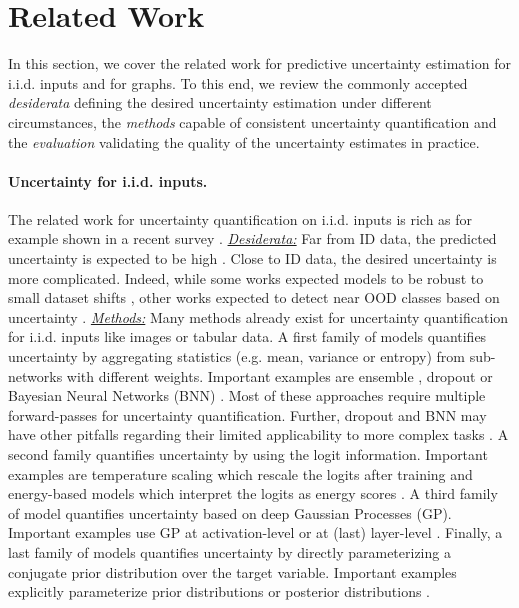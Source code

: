 \section{Related Work}
\label{sec:related_work_009}

In this section, we cover the related work for predictive uncertainty estimation for i.i.d. inputs and for graphs. To this end, we review the commonly accepted \emph{desiderata} defining the desired uncertainty estimation under different circumstances, the \emph{methods} capable of consistent uncertainty quantification and the \emph{evaluation} validating the quality of the uncertainty estimates in practice.

\paragraph{Uncertainty for i.i.d. inputs.} The related work for uncertainty quantification on i.i.d. inputs is rich as for example shown in a recent survey \citep{review-uncertainty-dl}. \emph{\underline{Desiderata:}} Far from ID data, the predicted uncertainty is expected to be high \citep{provable-uncertainty, NatPN2021, bayesian-a-bit, sufficient-conditions-no-adversarial}. Close to ID data, the desired uncertainty is more complicated. Indeed, while some works expected models to be robust to small dataset shifts \citep{dataset-shift, stutz2020}, other works expected to detect near OOD classes based on uncertainty \citep{contrastive-ood, robustness-uncertainty-dirichlet, attack-detection}. \emph{\underline{Methods:}} Many methods already exist for uncertainty quantification for i.i.d. inputs like images or tabular data. A first family of models quantifies uncertainty by aggregating statistics (e.g. mean, variance or entropy) from sub-networks with different weights. Important examples are ensemble \citep{ensembles, batch-ensembles, hyper-ensembles, mimo-independent-subnetworks}, dropout \citep{Srivastava2014} or Bayesian Neural Networks (BNN) \citep{bayesian-networks, Depeweg2018, simple-baseline-uncertainty, liberty-depth-bnn, rank-1-bnn}. Most of these approaches require multiple forward-passes for uncertainty quantification. Further, dropout and BNN may have other pitfalls regarding their limited applicability to more complex tasks \citep{Osband2016, Hron2018, practical-bnn, expressiveness-bnn}. A second family quantifies uncertainty by using the logit information. Important examples are temperature scaling which rescale the logits after training \citep{calibration-network, Liang2017} and energy-based models which interpret the logits as energy scores \citep{energy-ood, energy}. A third family of model quantifies uncertainty based on deep Gaussian Processes (GP). Important examples use GP at activation-level \cite{gp-uncertainty-activation} or at (last) layer-level \citep{uncertainty-distance-awareness, bayesian-a-bit, duq,uceloss}. Finally, a last family of models quantifies uncertainty by directly parameterizing a conjugate prior distribution over the target variable. Important examples explicitly parameterize prior distributions \citep{sensoy2018, distribution-distillation, PriorNetworks, reverse-kl, evidential-regression} or posterior distributions \citep{charpentier2020, NatPN2021}. 